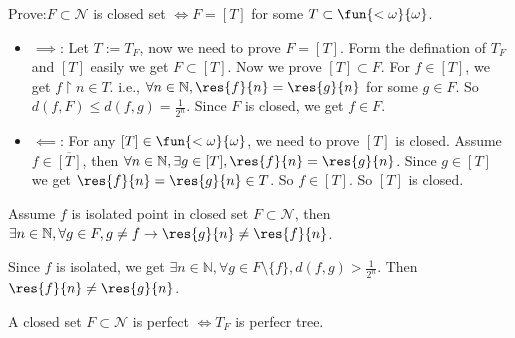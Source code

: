 \documentclass{ctexart}
\newif\ifpreface
\begin{document}
\large
\setlength{\baselineskip}{1.2em}
\ifpreface
    
\else
\maketitle
\fi
{}
\begin{problem}
  Prove:\(F \subset \mathcal{N}\) is closed set \(\iff F = [T]\) for some \(T \subset \fun{<\omega}{\omega}\). 
\end{problem}
\begin{solution}
  \begin{itemize}
    \item \(\implies\): Let \(T:=T_F\), now we need to prove \(F=[T]\). 
      Form the defination of \(T_F\) and \([T]\) easily we get \(F \subset [T]\). 
      Now we prove \([T] \subset F\). For \(f \in [T]\), we get \(f\upharpoonright n \in T\). 
      i.e., \(\forall n \in \mathbb{N}, \res{f}{n}=\res{g}{n}\) for some \(g \in F\). 
      So \(d(f,F) \leq d(f,g)=\frac{1}{2^n}\). Since \(F\) is closed, we get \(f \in F\). 

    \item \(\impliedby\): For any \([T] \in \fun{<\omega}{\omega}\), we need to prove \([T]\) is closed. 
      Assume \(f \in \overline{[T]}\), then \(\forall n \in \mathbb{N},\exists g \in [T],\res{f}{n}=\res{g}{n}\). 
      Since \(g \in [T]\) we get \(\res{f}{n}=\res{g}{n} \in T\). So \(f \in [ T]\). 
      So \([T]\) is closed. 
  \end{itemize}
\end{solution}

\begin{problem}
  Assume \(f\) is isolated point in closed set \(F \subset \mathcal{N}\), then 
  \(\exists n \in \mathbb{N},\forall g \in F,g \neq f \to \res{g}{n} \neq \res{f}{n}\). 
\end{problem}

\begin{solution}
  Since \(f\) is isolated, we get \(\exists n \in \mathbb{N},\forall g \in F \setminus \{f\},d(f,g)>\frac{1}{2^n}\). 
  Then \(\res{f}{n} \neq \res{g}{n}\). 
\end{solution}

\begin{problem}
  A closed set \(F \subset \mathcal{N}\) is perfect \(\iff T_F\) is perfecr tree. 
\end{problem}
\end{document}
